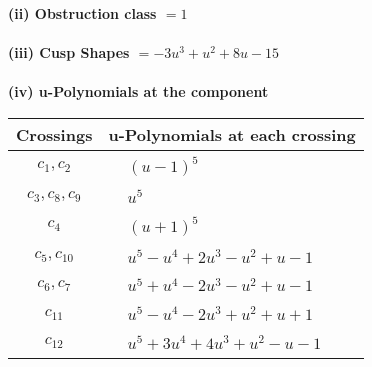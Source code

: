 \documentclass[1p]{elsarticle_modified}
\theoremstyle{definition}
\begin{document}
\flushleft \textbf{(ii) Obstruction class $= 1$}\\~\\
\flushleft \textbf{(iii) Cusp Shapes $= -3 u^3+u^2+8 u-15$}\\~\\
\newpage\renewcommand{\arraystretch}{1}
\flushleft \textbf{(iv) u-Polynomials at the component}\newline \\
\begin{tabular}{m{50pt}|m{274pt}}
Crossings & \hspace{64pt}u-Polynomials at each crossing \\
\hline $$\begin{aligned}c_{1},c_{2}\end{aligned}$$&$\begin{aligned}
&(u-1)^5
\end{aligned}$\\
\hline $$\begin{aligned}c_{3},c_{8},c_{9}\end{aligned}$$&$\begin{aligned}
&u^5
\end{aligned}$\\
\hline $$\begin{aligned}c_{4}\end{aligned}$$&$\begin{aligned}
&(u+1)^5
\end{aligned}$\\
\hline $$\begin{aligned}c_{5},c_{10}\end{aligned}$$&$\begin{aligned}
&u^5- u^4+2 u^3- u^2+u-1
\end{aligned}$\\
\hline $$\begin{aligned}c_{6},c_{7}\end{aligned}$$&$\begin{aligned}
&u^5+u^4-2 u^3- u^2+u-1
\end{aligned}$\\
\hline $$\begin{aligned}c_{11}\end{aligned}$$&$\begin{aligned}
&u^5- u^4-2 u^3+u^2+u+1
\end{aligned}$\\
\hline $$\begin{aligned}c_{12}\end{aligned}$$&$\begin{aligned}
&u^5+3 u^4+4 u^3+u^2- u-1
\end{aligned}$\\
\hline
\end{tabular}\\~\\
\end{document}
